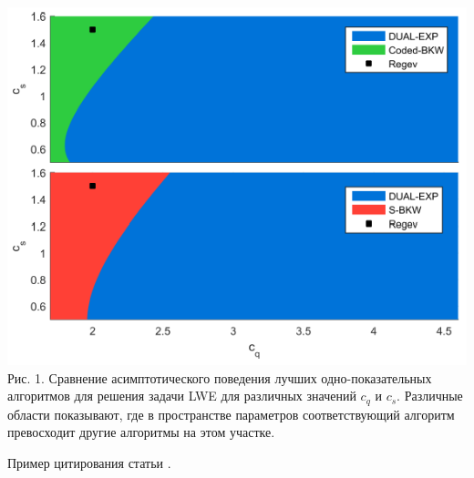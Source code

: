 \documentclass[a4paper,11pt]{article}
\begin{document}
\begin{center}
\includegraphics[scale=0.5]{1.png}\\
Рис. 1. Сравнение асимптотического поведения лучших одно-показательных алгоритмов для решения задачи LWE для различных значений $c_q$ и $c_s$. Различные области показывают, где в пространстве параметров соответствующий алгоритм превосходит другие алгоритмы на этом участке.
\end{center}

Пример цитирования статьи \cite{KF15}.



\def\shortbib{1}


\end{document}
